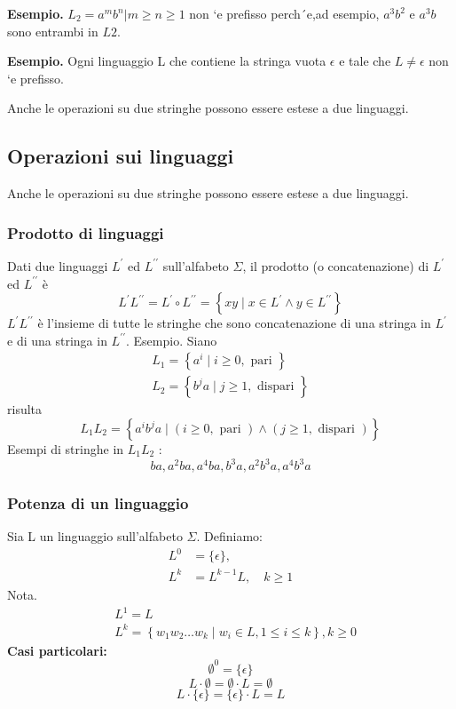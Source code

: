 \vspace{5mm}

\textbf{Esempio.} \(L_2 = {a^{m}b^{n}| m \geq n \geq 1}\) non `e prefisso perch´e,ad esempio, \(a^{3}b^{2}\) e \(a^{3}b\) sono entrambi in \(L2\).

\vspace{5mm}

\textbf{Esempio.} Ogni linguaggio L che contiene la stringa vuota \(\epsilon\) e
tale che \(L \neq {\epsilon}\) non `e prefisso.

Anche le operazioni su due stringhe possono essere estese a
due linguaggi.

\subsection{Operazioni sui linguaggi}
Anche le operazioni su due stringhe possono essere estese a
due linguaggi.
\subsubsection{Prodotto di linguaggi}
Dati due linguaggi $L^{\prime}$ ed $L^{\prime \prime}$ sull'alfabeto $\Sigma$, il prodotto (o concatenazione) di $L^{\prime}$ ed $L^{\prime \prime}$ è
$$
L^{\prime} L^{\prime \prime}=L^{\prime} \circ L^{\prime \prime}=\left\{x y \mid x \in L^{\prime} \wedge y \in L^{\prime \prime}\right\}
$$
$L^{\prime} L^{\prime \prime}$ è l'insieme di tutte le stringhe che sono concatenazione di una stringa in $L^{\prime}$ e di una stringa in $L^{\prime \prime}$.
Esempio. Siano
$$
\begin{gathered}
L_{1}=\left\{a^{i} \mid i \geq 0, \text { pari }\right\} \\
L_{2}=\left\{b^{j} a \mid j \geq 1, \text { dispari }\right\}
\end{gathered}
$$
risulta
$$
L_{1} L_{2}=\left\{a^{i} b^{j} a \mid(i \geq 0, \text { pari }) \wedge(j \geq 1, \text { dispari })\right\}
$$
Esempi di stringhe in $L_{1} L_{2}$ :
$$
b a, a^{2} b a, a^{4} b a, b^{3} a, a^{2} b^{3} a, a^{4} b^{3} a
$$
\subsubsection{Potenza di un linguaggio}
Sia L un linguaggio sull'alfabeto $\Sigma$. Definiamo:
$$
\begin{aligned}
L^{0} &=\{\epsilon\}, \\
L^{k} &=L^{k-1} L, \quad k \geq 1
\end{aligned}
$$
Nota.
$$
\begin{aligned}
&L^{1}=L \\
&L^{k}=\left\{w_{1} w_{2} \ldots w_{k} \mid w_{i} \in L, 1 \leq i \leq k\right\}, k \geq 0
\end{aligned}
$$
\textbf{Casi particolari:} 
$$
\emptyset^{0} =\{\epsilon\} 
$$
$$
L \cdot \emptyset =\emptyset \cdot L=\emptyset 
$$
$$
L \cdot\{\epsilon\} =\{\epsilon\} \cdot L=L
$$

